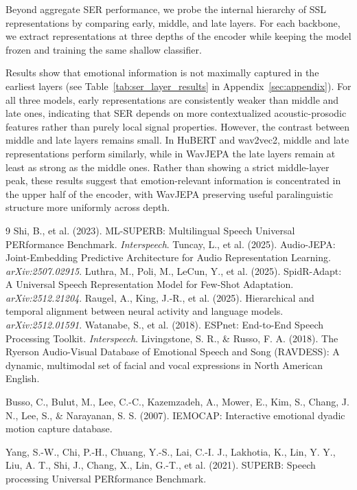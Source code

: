 \documentclass[11pt]{article}
\begin{document}
Beyond aggregate SER performance, we probe the internal hierarchy of SSL representations by comparing early, middle, and late layers. For each backbone, we extract representations at three depths of the encoder while keeping the model frozen and training the same shallow classifier.

Results show that emotional information is not maximally captured in the earliest layers (see Table~\ref{tab:ser_layer_results} in Appendix~\ref{sec:appendix}). For all three models, early representations are consistently weaker than middle and late ones, indicating that SER depends on more contextualized acoustic-prosodic features rather than purely local signal properties. However, the contrast between middle and late layers remains small. In HuBERT and wav2vec2, middle and late representations perform similarly, while in WavJEPA the late layers remain at least as strong as the middle ones. Rather than showing a strict middle-layer peak, these results suggest that emotion-relevant information is concentrated in the upper half of the encoder, with WavJEPA preserving useful paralinguistic structure more uniformly across depth.
\newpage
\begin{thebibliography}{9}
 Shi, B., et al. (2023). ML-SUPERB: Multilingual Speech Universal PERformance Benchmark. \textit{Interspeech}.
 Tuncay, L., et al. (2025). Audio-JEPA: Joint-Embedding Predictive Architecture for Audio Representation Learning. \textit{arXiv:2507.02915}.
 Luthra, M., Poli, M., LeCun, Y., et al. (2025). SpidR-Adapt: A Universal Speech Representation Model for Few-Shot Adaptation. \textit{arXiv:2512.21204}.
 Raugel, A., King, J.-R., et al. (2025). Hierarchical and temporal alignment between neural activity and language models. \textit{arXiv:2512.01591}.
 Watanabe, S., et al. (2018). ESPnet: End-to-End Speech Processing Toolkit. \textit{Interspeech}.
 Livingstone, S. R., \& Russo, F. A. (2018). The Ryerson Audio-Visual Database of Emotional Speech and Song (RAVDESS): A dynamic, multimodal set of facial and vocal expressions in North American English.

 Busso, C., Bulut, M., Lee, C.-C., Kazemzadeh, A., Mower, E., Kim, S., Chang, J. N., Lee, S., \& Narayanan, S. S. (2007). IEMOCAP: Interactive emotional dyadic motion capture database.

 Yang, S.-W., Chi, P.-H., Chuang, Y.-S., Lai, C.-I. J., Lakhotia, K., Lin, Y. Y., Liu, A. T., Shi, J., Chang, X., Lin, G.-T., et al. (2021). SUPERB: Speech processing Universal PERformance Benchmark.
\end{thebibliography}
\end{document}
